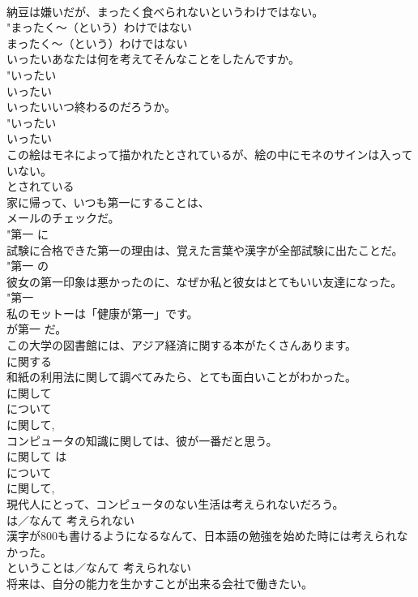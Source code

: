 \documentclass[8pt]{extreport}
\begin{document}
\begin{CJK}{UTF8}{min}
{{\\	納豆は嫌いだが、まったく食べられないというわけではない。	
\\	"まったく〜（という）わけではない 
\\	まったく〜（という）わけではない 
\\	いったいあなたは何を考えてそんなことをしたんですか。	
\\	"いったい 
\\	いったい 
\\	いったいいつ終わるのだろうか。	
\\	"いったい 
\\	いったい 
\\	この絵はモネによって描かれたとされているが、絵の中にモネのサインは入っていない。	
\\	とされている 
\\	家に帰って、いつも第一にすることは、
\\	メールのチェックだ。	
\\	"第一 に 
\\	試験に合格できた第一の理由は、覚えた言葉や漢字が全部試験に出たことだ。	
\\	"第一 の
\\	彼女の第一印象は悪かったのに、なぜか私と彼女はとてもいい友達になった。	
\\	"第一 
\\	私のモットーは「健康が第一」です。	
\\	が第一 だ。 
\\	この大学の図書館には、アジア経済に関する本がたくさんあります。	
\\	に関する 
\\	和紙の利用法に関して調べてみたら、とても面白いことがわかった。	
\\	に関して 
\\	について 
\\	に関して, 
\\	コンピュータの知識に関しては、彼が一番だと思う。	
\\	に関して は 
\\	について 
\\	に関して, 
\\	現代人にとって、コンピュータのない生活は考えられないだろう。	
\\	{は／なんて} 考えられない 
\\	漢字が800も書けるようになるなんて、日本語の勉強を始めた時には考えられなかった。	
\\	{ということは／なんて} 考えられない 
\\	将来は、自分の能力を生かすことが出来る会社で働きたい。	
}}
\end{CJK}
\end{document}
